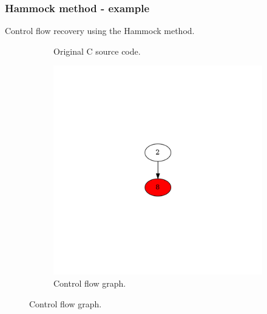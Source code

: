 \documentclass[aspectratio=1610]{beamer}
\begin{document}
\begin{frame}
	\frametitle{Hammock method - example}
	Control flow recovery using the Hammock method.
	\begin{figure}[htbp]
		\centering
		\begin{subfigure}[b]{0.30\textwidth}
			\centering
			
			\caption{Original C source code.}
		\end{subfigure}
		\begin{subfigure}[b]{0.50\textwidth}
			\centering
			\includegraphics[height=0.6\paperheight]{inc/methods/hammock/example/without-break/main_0003b.png}
			\caption{Control flow graph.}
		\end{subfigure}
	\end{figure}
\end{frame}
\end{document}
